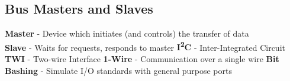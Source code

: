 \subsection{Bus Masters and Slaves}
\textbf{Master} - Device which initiates (and controls) the transfer of data\\
\textbf{Slave} - Waits for requests, responds to master
\textbf{I\textsuperscript{2}C} - Inter-Integrated Circuit
\textbf{TWI} - Two-wire Interface
\textbf{1-Wire} - Communication over a single wire
\textbf{Bit Bashing} - Simulate I/O standards with general purpose ports